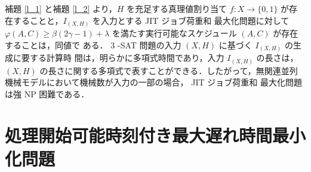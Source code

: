 \documentclass[12pt]{optlab-bachelor}
\begin{document}
補題 \ref{l_1} と補題 \ref{l_2} より，$H$ を充足する真理値割り当て $f : X \to \{0,
1\}$ が存在することと，$I_{(X,H)}$ を入力とする JIT ジョブ荷重和
最大化問題に対して $\varphi(A, C) \ge \beta(2\gamma − 1) + \lambda$
を満たす実行可能なスケジュール $(A, C)$ が存在することは，同値で
ある．
3 -SAT 問題の入力 $(X,H)$ に基づく $I_{(X,H)}$ の生成に要する計算時
間は，明らかに多項式時間であり，入力 $I_{(X,H)}$ の長さは，$(X, H)$
の長さに関する多項式で表すことができる．したがって，無関連並列
機械モデルにおいて機械数が入力の一部の場合， JIT ジョブ荷重和
最大化問題は強 NP 困難である．

\section{処理開始可能時刻付き最大遅れ時間最小化問題}\label{3_s_2}
\end{document}

